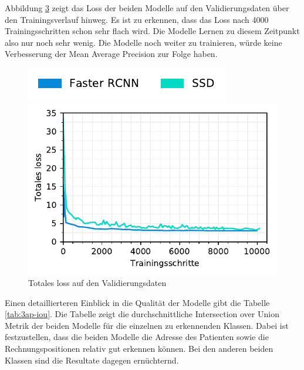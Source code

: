 \begin{figure}[H]
\begin{subfigure}[t]{0.5\linewidth}
    \label{fig:3ap-map:map_val}
    \vspace{2ex}
  \end{subfigure}
\end{figure}

Abbildung \ref{fig:3ap-map:loss} zeigt das Loss der beiden Modelle auf den Validierungsdaten über den Trainingsverlauf hinweg. Es ist zu erkennen, dass das Loss nach 4000 Trainingsschritten schon sehr flach wird. Die Modelle Lernen zu diesem Zeitpunkt also nur noch sehr wenig. Die Modelle noch weiter zu trainieren, würde keine Verbesserung der Mean Average Precision zur Folge haben.

\begin{figure}[h!] 
    \captionsetup{width=.9\linewidth}
    \caption{Totales loss auf den Validierungsdaten}
    \label{fig:3ap-map:loss}
    \centering
    \includegraphics[scale=1]{graphics/matplot/img-detection__legend_1.pdf}
    
    \includegraphics[scale=1]{graphics/matplot/img-detection__all__loss.pdf}
\end{figure}

Einen detaillierteren Einblick in die Qualität der Modelle gibt die Tabelle \ref{tab:3ap-iou}. Die Tabelle zeigt die durchschnittliche Intersection over Union Metrik der beiden Modelle für die einzelnen zu erkennenden Klassen. Dabei ist festzustellen, dass die beiden Modelle die Adresse des Patienten sowie die Rechnungspositionen relativ gut erkennen können. Bei den anderen beiden Klassen sind die Resultate dagegen ernüchternd.

